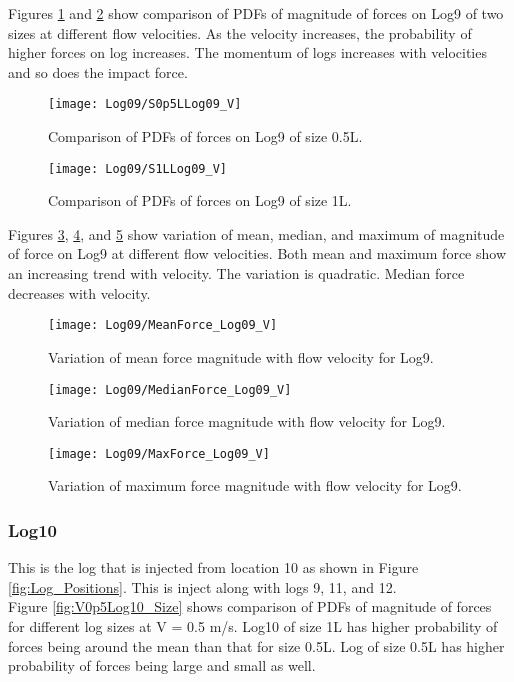 \noindent Figures \ref{fig:S0p5LLog09_V} and \ref{fig:S1LLog09_V} show comparison of PDFs of magnitude of forces on Log9 of two sizes at different flow velocities. As the velocity increases, the probability of higher forces on log increases. The momentum of logs increases with velocities and so does the impact force.

\begin{figure}
\centering
\texttt{[image: Log09/S0p5LLog09\_V]}
\caption{\label{fig:S0p5LLog09_V}Comparison of PDFs of forces on Log9 of size 0.5L.}
\end{figure}
\begin{figure}
\centering
\texttt{[image: Log09/S1LLog09\_V]}
\caption{\label{fig:S1LLog09_V}Comparison of PDFs of forces on Log9 of size 1L.}
\end{figure}

\noindent Figures \ref{fig:MeanForce_Log09_V}, \ref{fig:MedianForce_Log09_V}, and \ref{fig:MaxForce_Log09_V} show variation of mean, median, and maximum of magnitude of force on Log9 at different flow velocities. Both mean and maximum force show an increasing trend with velocity. The variation is quadratic. Median force decreases with velocity.

\begin{figure}
\centering
\texttt{[image: Log09/MeanForce\_Log09\_V]}
\caption{\label{fig:MeanForce_Log09_V}Variation of mean force magnitude with flow velocity for Log9.}
\end{figure}
\begin{figure}
\centering
\texttt{[image: Log09/MedianForce\_Log09\_V]}
\caption{\label{fig:MedianForce_Log09_V}Variation of median force magnitude with flow velocity for Log9.}
\end{figure}
\begin{figure}
\centering
\texttt{[image: Log09/MaxForce\_Log09\_V]}
\caption{\label{fig:MaxForce_Log09_V}Variation of maximum force magnitude with flow velocity for Log9.}
\end{figure}

\FloatBarrier
\subsubsection{Log10}
This is the log that is injected from location 10 as shown in Figure \ref{fig:Log_Positions}. This is inject along with logs 9, 11, and 12.\\ 
Figure \ref{fig:V0p5Log10_Size} shows comparison of PDFs of magnitude of forces for different log sizes at V = 0.5 m/s. Log10 of size 1L has higher probability of forces being around the mean than that for size 0.5L. Log of size 0.5L has higher probability of forces being large and small as well.

